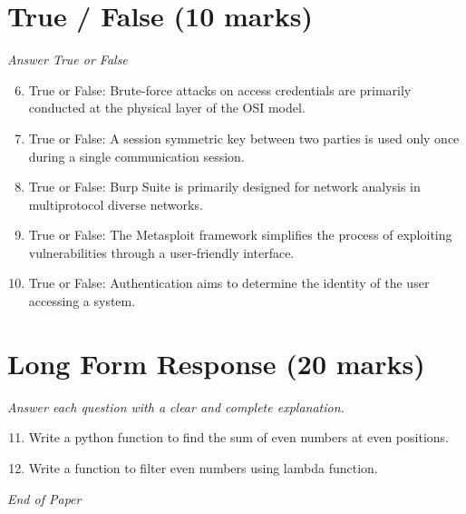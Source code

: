\documentclass[12pt]{article}
\begin{document}
\section*{True / False (10 marks)}
\textit{Answer True or False}
\begin{enumerate}[label=\arabic*.]
\setcounter{enumi}{5}
\item True or False: Brute-force attacks on access credentials are primarily conducted at the physical layer of the OSI model.
\item True or False: A session symmetric key between two parties is used only once during a single communication session.
\item True or False: Burp Suite is primarily designed for network analysis in multiprotocol diverse networks.
\item True or False: The Metasploit framework simplifies the process of exploiting vulnerabilities through a user-friendly interface.
\item True or False: Authentication aims to determine the identity of the user accessing a system.
\end{enumerate}

\section*{Long Form Response (20 marks)}
\textit{Answer each question with a clear and complete explanation.}
\begin{enumerate}[label=\arabic*.]
\setcounter{enumi}{10}
\item Write a python function to find the sum of even numbers at even positions.
\item Write a function to filter even numbers using lambda function.
\end{enumerate}

\vfill
\noindent\textit{End of Paper}
\end{document}
